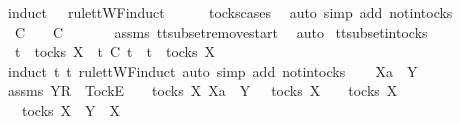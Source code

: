 \begin{isabellebody}
\ {\isacharparenleft}induct\ {\isasymrho}{\isacharprime}\ {\isasymrho}\ rule{\isacharcolon}ttWF{}{\isachardot}induct{\isacharparenright}\isanewline
\ \ \ \ \isamarkupfalse%
\ tocks{\isachardot}cases\ \isamarkupfalse%
\ {\isacharparenleft}auto\ simp\ add{\isacharcolon}\ notin{\isacharunderscore}tocks{\isacharparenright}\isanewline
\ \ \isamarkupfalse%
\ \isamarkupfalse%
\ {\isachardoublequoteopen}{\isasymrho}{\isacharprime}\ {\isasymsubseteq}\isactrlsub C\ {\isasymrho}\ {\isasymand}\ {\isasymsigma}{\isacharprime}\ {\isasymsubseteq}\isactrlsub C\ {\isasymsigma}{\isachardoublequoteclose}\isanewline
\ \ \ \ \isamarkupfalse%
\ assms{\isacharparenleft}{}{\isacharparenright}\ tt{\isacharunderscore}subset{\isacharunderscore}remove{\isacharunderscore}start\ \isamarkupfalse%
\ auto\isanewline
{}\isamarkupfalse%
%
\endisatagproof
{\isafoldproof}%
%
\isadelimproof
\isanewline
%
\endisadelimproof
\isanewline
{}\isamarkupfalse%
\ tt{\isacharunderscore}subset{\isacharunderscore}in{\isacharunderscore}tocks{\isacharcolon}\isanewline
\ \ {\isachardoublequoteopen}t\ {\isasymin}\ tocks\ X\ {\isasymLongrightarrow}\ t{\isacharprime}\ {\isasymsubseteq}\isactrlsub C\ t\ {\isasymLongrightarrow}\ t{\isacharprime}\ {\isasymin}\ tocks\ X{\isachardoublequoteclose}\isanewline
%
\isadelimproof
%
\endisadelimproof
%
\isatagproof
{}\isamarkupfalse%
\ {\isacharparenleft}induct\ t{\isacharprime}\ t\ rule{\isacharcolon}ttWF{}{\isachardot}induct{\isacharcomma}\ auto\ simp\ add{\isacharcolon}\ notin{\isacharunderscore}tocks{\isacharparenright}\isanewline
\ \ \isamarkupfalse%
\ Xa\ {\isasymrho}\ Y\ {\isasymsigma}\isanewline
\ \ \isamarkupfalse%
\ assms{\isacharcolon}\ {\isachardoublequoteopen}{\isacharbrackleft}Y{\isacharbrackright}\isactrlsub R\ {\isacharhash}\ {\isacharbrackleft}Tock{\isacharbrackright}\isactrlsub E\ {\isacharhash}\ {\isasymsigma}\ {\isasymin}\ tocks\ X{\isachardoublequoteclose}\ {\isachardoublequoteopen}Xa\ {\isasymsubseteq}\ Y{\isachardoublequoteclose}\ {\isachardoublequoteopen}{\isasymsigma}\ {\isasymin}\ tocks\ X\ {\isasymLongrightarrow}\ {\isasymrho}\ {\isasymin}\ tocks\ X{\isachardoublequoteclose}\isanewline
\ \ \isamarkupfalse%
\ \isamarkupfalse%
\ {\isachardoublequoteopen}{\isasymsigma}\ {\isasymin}\ tocks\ X\ {\isasymand}\ Y\ {\isasymsubseteq}\ X{\isachardoublequoteclose}\isanewline
\ \ \ \ \isamarkupfalse%

\end{isabellebody}
